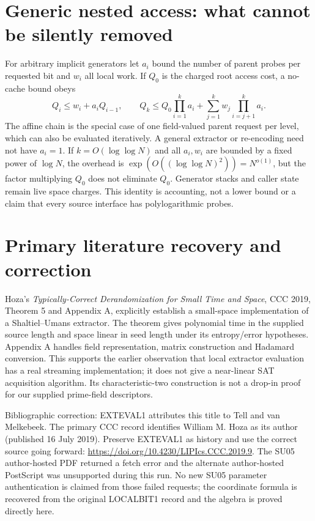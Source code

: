 \documentclass[11pt]{article}
\begin{document}
\section*{Generic nested access: what cannot be silently removed}
For arbitrary implicit generators let $a_i$ bound the number of parent
probes per requested bit and $w_i$ all local work. If $Q_0$ is the charged
root access cost, a no-cache bound obeys
\[
 Q_i\le w_i+a_iQ_{i-1},\qquad
 Q_k\le Q_0\prod_{i=1}^k a_i+
       \sum_{j=1}^k w_j\prod_{i=j+1}^k a_i.
\]
The affine chain is the special case of one field-valued parent request
per level, which can also be evaluated iteratively. A general extractor
or re-encoding need not have $a_i=1$. If $k=O(\log\log N)$ and all
$a_i,w_i$ are bounded by a fixed power of $\log N$, the overhead is
$\exp(O((\log\log N)^2))=N^{o(1)}$, but the factor multiplying $Q_0$
does not eliminate $Q_0$. Generator stacks and caller state remain live
space charges. This identity is accounting, not a lower bound or a
claim that every source interface has polylogarithmic probes.

\section*{Primary literature recovery and correction}
Hoza's \emph{Typically-Correct Derandomization for Small Time and Space},
CCC 2019, Theorem 5 and Appendix A, explicitly establish a small-space
implementation of a Shaltiel--Umans extractor. The theorem gives
polynomial time in the supplied source length and space linear in seed
length under its entropy/error hypotheses. Appendix A handles field
representation, matrix construction and Hadamard conversion. This
supports the earlier observation that local extractor evaluation has a
real streaming implementation; it does not give a near-linear SAT
acquisition algorithm. Its characteristic-two construction is not a
drop-in proof for our supplied prime-field descriptors.

Bibliographic correction: EXTEVAL1 attributes this title to Tell and
van Melkebeek. The primary CCC record identifies William M. Hoza as its
author (published 16 July 2019). Preserve EXTEVAL1 as history and use the
correct source going forward:
\url{https://doi.org/10.4230/LIPIcs.CCC.2019.9}.
The SU05 author-hosted PDF returned a fetch error and the alternate
author-hosted PostScript was unsupported during this run. No new SU05
parameter authentication is claimed from those failed requests; the
coordinate formula is recovered from the original LOCALBIT1 record and
the algebra is proved directly here.
\end{document}

